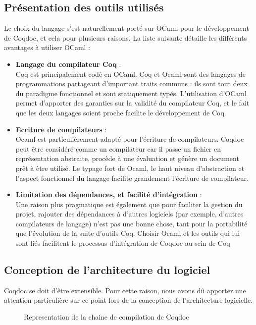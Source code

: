 \documentclass[a4paper, 11pt]{report}
\begin{document}
    \subsection{Présentation des outils utilisés}
    Le choix du langage s'est naturellement porté sur OCaml pour le
    développement de Coqdoc, et cela pour plusieurs raisons. La liste
    suivante détaille les différents avantages à utiliser OCaml :
    \begin{itemize}
      \item \textbf{Langage du compilateur Coq} : \\
        Coq est principalement codé en OCaml. Coq et Ocaml sont des langages
        de programmations partageant d'important traits communs : ils sont tout
        deux du paradigme fonctionnel et sont statiquement typés. L'utilisation
        d'OCaml permet d'apporter des garanties sur la validité du compilateur
        Coq, et le fait que les deux langages soient proche facilite le
        développement de Coq.
      \item \textbf{Ecriture de compilateurs} : \\
        Ocaml est particulièrement adapté pour l'écriture de compilateurs.
        Coqdoc peut être considéré comme un compilateur car il passe un fichier
        en représentation abstraite, procède à une évaluation et génère un
        document prêt à ètre utilisé. Le typage fort de Ocaml, le haut niveau
        d'abstraction et l'aspect fonctionnel du langage facilite grandement
        l'écriture de compilateur.
      \item \textbf{Limitation des dépendances, et facilité d'intégration} : \\
        Une raison plus pragmatique est également que pour faciliter la gestion
        du projet, rajouter des dépendances à d'autres logiciels (par exemple,
        d'autres compilateurs de langage) n'est pas une bonne chose, tant pour
        la portabilité que l'évolution de la suite d'outils Coq. Choisir
        Ocaml et les outils qui lui sont liés facilitent le processus
        d'intégration de Coqdoc au sein de Coq
    \end{itemize}
    \subsection{Conception de l'architecture du logiciel}
    Coqdoc se doit d'être extensible. Pour cette raison, nous avons dû apporter
    une attention particulière sur ce point lors de la conception de
    l'architecture logicielle.
    \begin{figure}
      \caption{Representation de la chaine de compilation de Coqdoc}
    \end{figure}
\end{document}
